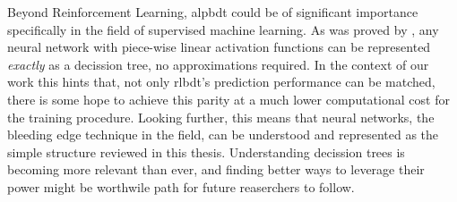 Beyond Reinforcement Learning, \ac{alpbdt} could be of significant importance
specifically in the field of supervised machine learning. As was proved by
\cite{caglar22}, any neural network with piece-wise linear activation functions
can be represented \emph{exactly} as a decission tree, no approximations
required. In the context of our work this hints that, not only \ac{rlbdt}'s
prediction performance \cite{xiong} can be matched, there is some hope to
achieve this parity at a much lower computational cost for the training
procedure. Looking further, this means that neural networks, the bleeding edge
technique in the field, can be understood and represented as the simple
structure reviewed in this thesis. Understanding decission trees is becoming
more relevant than ever, and finding better ways to leverage their power might
be worthwile path for future reaserchers to follow.